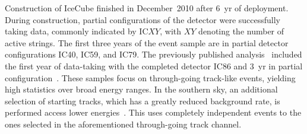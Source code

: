 \documentclass[aps,10pt,prd,twocolumn,floats,letterpaper,showpacs,nofootinbib,bibnotes,notitlepage,superscriptaddress]{revtex4-1}
\begin{document}
Construction of IceCube finished in December~2010 after 6~yr of
deployment. During construction, partial configurations of the detector were
successfully taking data, commonly indicated by IC$XY$, with $XY$ denoting the
number of active strings. The first three years of the event sample are in
partial detector configurations IC40, IC59, and IC79. The previously published
analysis~\citep{Aartsen:2014cva} included the first year of data-taking with
the completed detector IC86 and 3~yr in partial
configuration~\citep{Abbasi:2010rd, Aartsen:2013uuv}. These samples focus on
through-going track-like events, yielding high statistics over broad energy
ranges. In the southern sky, an additional selection of starting tracks, which
has a greatly reduced background rate, is performed access lower
energies~\citep{Aartsen:2016tpb}.  This uses completely independent events to
the ones selected in the aforementioned through-going track channel.

%
\end{document}
